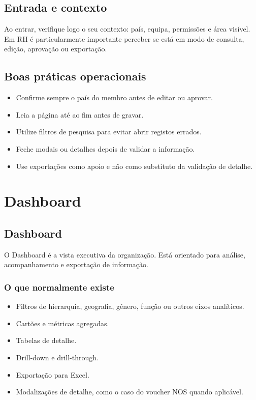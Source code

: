 \section{Entrada e contexto}
Ao entrar, verifique logo o seu contexto: país, equipa, permissões e área visível. Em RH é particularmente importante perceber se está em modo de consulta, edição, aprovação ou exportação.

\section{Boas práticas operacionais}
\begin{itemize}
  \item Confirme sempre o país do membro antes de editar ou aprovar.
  \item Leia a página até ao fim antes de gravar.
  \item Utilize filtros de pesquisa para evitar abrir registos errados.
  \item Feche modais ou detalhes depois de validar a informação.
  \item Use exportações como apoio e não como substituto da validação de detalhe.
\end{itemize}

\chapter{Dashboard}
\section{Dashboard}
O Dashboard é a vista executiva da organização. Está orientado para análise, acompanhamento e exportação de informação.

\subsection{O que normalmente existe}
\begin{itemize}
  \item Filtros de hierarquia, geografia, género, função ou outros eixos analíticos.
  \item Cartões e métricas agregadas.
  \item Tabelas de detalhe.
  \item Drill-down e drill-through.
  \item Exportação para Excel.
  \item Modalizações de detalhe, como o caso do voucher NOS quando aplicável.
\end{itemize}

